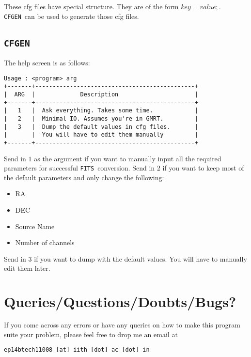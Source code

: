 \documentclass{article}
\newcommand{\cfgen}{\texttt{CFGEN}\ }
\newcommand{\fits}{\texttt{FITS}\ }
\begin{document}
\par These cfg files have special structure. They are of the form $key=value;$. \cfgen can be used to generate those cfg files. 
\subsection*{\hfill \cfgen}
\par The help screen is as follows:
\begin{lstlisting}
Usage : <program> arg
+-------+----------------------------------------------+
|  ARG  |             Description                      |
+-------+----------------------------------------------+
|   1   |  Ask everything. Takes some time.            |
|   2   |  Minimal IO. Assumes you're in GMRT.         |
|   3   |  Dump the default values in cfg files.       |
|       |  You will have to edit them manually         |
+-------+----------------------------------------------+
\end{lstlisting}
Send in $1$ as the argument if you want to manually input all the required parameters for successful \fits conversion. Send in $2$ if you want to keep most of the default parameters and only change the following:
\begin{multicols}{4}
\begin{itemize}
\item RA
\item DEC
\item Source Name
\item Number of channels
\end{itemize}
\end{multicols}

Send in $3$ if you want to dump with the default values. You will have to manually edit them later.  
\section*{\hfill Queries/Questions/Doubts/Bugs?}
\par If you come across any errors or have any queries on how to make this program suite your problem, please feel free to drop me an email at 
\begin{verbatim}
ep14btech11008 [at] iith [dot] ac [dot] in
\end{verbatim}
\end{document}
